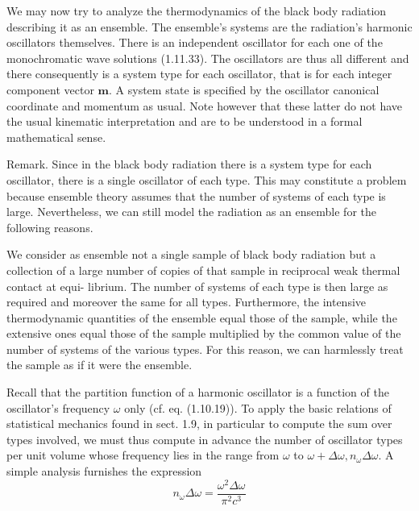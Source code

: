 \documentclass{article}
\begin{document}
We may now try to analyze the thermodynamics of the black body radiation describing it as an ensemble. The ensemble's systems are the radiation's harmonic oscillators themselves. There is an independent oscillator for each one of the monochromatic wave solutions (1.11.33). The oscillators are thus all different and there consequently is a system type for each oscillator, that is for each integer component vector $\boldsymbol{m}$. A system state is specified by the oscillator canonical coordinate and momentum as usual. Note however that these latter do not have the usual kinematic interpretation and are to be understood in a formal mathematical sense.

Remark. Since in the black body radiation there is a system type for each oscillator, there is a single oscillator of each type. This may constitute a problem because ensemble theory assumes that the number of systems of each type is large. Nevertheless, we can still model the radiation as an ensemble for the following reasons.

We consider as ensemble not a single sample of black body radiation but a collection of a large number of copies of that sample in reciprocal weak thermal contact at equi-
librium. The number of systems of each type is then large as required and moreover the same for all types. Furthermore, the intensive thermodynamic quantities of the ensemble equal those of the sample, while the extensive ones equal those of the sample multiplied by the common value of the number of systems of the various types. For this reason, we can harmlessly treat the sample as if it were the ensemble.

Recall that the partition function of a harmonic oscillator is a function of the oscillator's frequency $\omega$ only (cf. eq. (1.10.19)). To apply the basic relations of statistical mechanics found in sect. 1.9, in particular to compute the sum over types involved, we must thus compute in advance the number of oscillator types per unit volume whose frequency lies in the range from $\omega$ to $\omega+\Delta \omega, n_{\omega} \Delta \omega$. A simple analysis furnishes the expression
$$
\begin{equation*}
n_{\omega} \Delta \omega=\frac{\omega^{2} \Delta \omega}{\pi^{2} c^{3}} \tag{1.11.60}
\end{equation*}
$$
\end{document}
